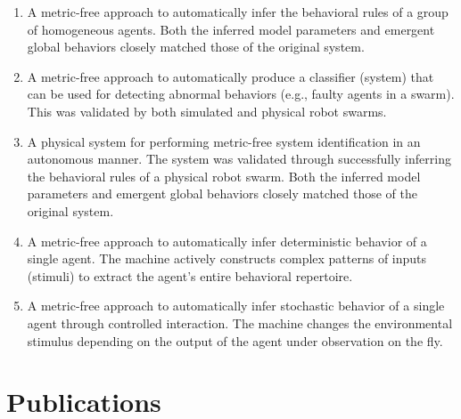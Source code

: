 \begin{enumerate}[1)]

\item A metric-free approach to automatically infer the behavioral rules of a group of homogeneous agents. Both the inferred model parameters and emergent global behaviors closely matched those of the original system. 

\item A metric-free approach to automatically produce a classifier (system) that can be used for detecting abnormal behaviors (e.g., faulty agents in a swarm). This was validated by both simulated and physical robot swarms.

\item A physical system for performing metric-free system identification in an autonomous manner. The system was validated through successfully inferring the behavioral rules of a physical robot swarm. Both the inferred model parameters and emergent global behaviors closely matched those of the original system. 

\item A metric-free approach to automatically infer deterministic behavior of a single agent. The machine actively constructs complex patterns of inputs (stimuli) to extract the agent's entire behavioral repertoire. 

\item A metric-free approach to automatically infer stochastic behavior of a single agent through controlled interaction. The machine changes the environmental stimulus depending on the output of the agent under observation on the fly.

\end{enumerate}

\section{Publications}

